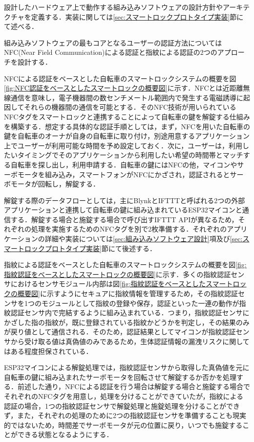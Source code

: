           \par 設計したハードウェア上で動作する組み込みソフトウェアの設計方針やアーキテクチャを定義する．実装に関しては\ref{sec:スマートロックプロトタイプ実装}節にて述べる．
          \par 組み込みソフトウェアの最もコアとなるユーザーの認証方法についてはNFC(Near Field Communication)による認証と指紋による認証の2つのアプローチを設計する．
          \par NFCによる認証をベースとした自転車のスマートロックシステムの概要を図\ref{fig:NFC認証をベースとしたスマートロックの概要図}に示す．NFCとは近距離無線通信を意味し，電子機器間の数センチメートル範囲内で発生する電磁誘導に起因してそれらの機器間の通信を可能とする\cite{al2012near}．そのNFC技術が用いられているNFCタグをスマートロックと連携することによって自転車の鍵を解錠する仕組みを構築する．想定する具体的な認証手順としては，まず，NFCを用いた自転車の鍵を自転車のオーナが自身の自転車に取り付け，別途用意するアプリケーション上でユーザーが利用可能な時間を予め設定しておく．次に，ユーザーは，利用したいタイミングでそのアプリケーションから利用したい希望の時間帯とマッチする自転車を探し出し，利用申請する．自転車の鍵にはNFCの他，マイコンやサーボモータを組み込み，スマートフォンがNFCにかざされ，認証されるとサーボモータが回転し，解錠する．
          \par 解錠する際のデータフローとしては，主にBlynkとIFTTTと呼ばれる2つの外部アプリケーションと連携して自転車の鍵に組み込まれているESP32マイコンと通信する．解錠する場合と施錠する場合で呼び出すIFTTT APIが異なるため，それぞれの処理を実施するためのNFCタグを別で2枚準備する．それぞれのアプリケーションの詳細や実装については\ref{sec:組み込みソフトウェア設計}項及び\ref{sec:スマートロックプロトタイプ実装}節にて後述する．
          \par 指紋による認証をベースとした自転車のスマートロックシステムの概要を図\ref{fig:指紋認証をベースとしたスマートロックの概要図}に示す．多くの指紋認証センサにおけるセンサモジュール内部は図\ref{fig:指紋認証をベースとしたスマートロックの概要図}に示すようにセキュアに指紋情報を管理するため，その指紋認証センサを1つのモジュールとして指紋の登録や保存，認証といった一連の動作が指紋認証センサ内で完結するように組み込まれている．つまり，指紋認証センサにかざした指の指紋が，既に登録されている指紋かどうかを判定し，その結果のみが戻り値として通信される．そのため，認証結果としてマイコンが指紋認証センサから受け取る値は真偽値のみであるため，生体認証情報の漏洩リスクに関してはある程度担保されている．
          \par ESP32マイコンによる解錠処理では，指紋認証センサから取得した真偽値を元に自転車の鍵に組み込まれたサーボモータを回転させて解錠するか否かを処理する．前述した通り，NFCによる認証を行う場合は解錠する場合と施錠する場合でそれぞれのNFCタグを用意し，処理を分けることができていたが，指紋による認証の場合，1つの指紋認証センサで解錠処理と施錠処理を分けることができず，また，それぞれの処理のために2つの指紋認証センサを準備することも現実的ではないため，時間差でサーボモータが元の位置に戻り，いつでも施錠することができる状態となるようにする．

